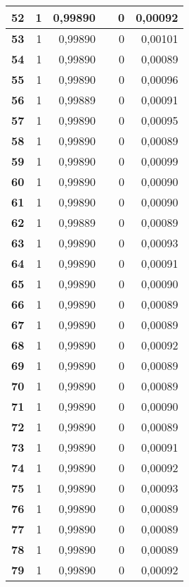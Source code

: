 {\begin{longtable}{|r|r|r|l|r|r|}
\textbf{52} & 1 & 0,99890 &  & 0 & 0,00092 \\ \hline
\textbf{53} & 1 & 0,99890 &  & 0 & 0,00101 \\ \hline
\textbf{54} & 1 & 0,99890 &  & 0 & 0,00089 \\ \hline
\textbf{55} & 1 & 0,99890 &  & 0 & 0,00096 \\ \hline
\textbf{56} & 1 & 0,99889 &  & 0 & 0,00091 \\ \hline
\textbf{57} & 1 & 0,99890 &  & 0 & 0,00095 \\ \hline
\textbf{58} & 1 & 0,99890 &  & 0 & 0,00089 \\ \hline
\textbf{59} & 1 & 0,99890 &  & 0 & 0,00099 \\ \hline
\textbf{60} & 1 & 0,99890 &  & 0 & 0,00090 \\ \hline
\textbf{61} & 1 & 0,99890 &  & 0 & 0,00090 \\ \hline
\textbf{62} & 1 & 0,99889 &  & 0 & 0,00089 \\ \hline
\textbf{63} & 1 & 0,99890 &  & 0 & 0,00093 \\ \hline
\textbf{64} & 1 & 0,99890 &  & 0 & 0,00091 \\ \hline
\textbf{65} & 1 & 0,99890 &  & 0 & 0,00090 \\ \hline
\textbf{66} & 1 & 0,99890 &  & 0 & 0,00089 \\ \hline
\textbf{67} & 1 & 0,99890 &  & 0 & 0,00089 \\ \hline
\textbf{68} & 1 & 0,99890 &  & 0 & 0,00092 \\ \hline
\textbf{69} & 1 & 0,99890 &  & 0 & 0,00089 \\ \hline
\textbf{70} & 1 & 0,99890 &  & 0 & 0,00089 \\ \hline
\textbf{71} & 1 & 0,99890 &  & 0 & 0,00090 \\ \hline
\textbf{72} & 1 & 0,99890 &  & 0 & 0,00089 \\ \hline
\textbf{73} & 1 & 0,99890 &  & 0 & 0,00091 \\ \hline
\textbf{74} & 1 & 0,99890 &  & 0 & 0,00092 \\ \hline
\textbf{75} & 1 & 0,99890 &  & 0 & 0,00093 \\ \hline
\textbf{76} & 1 & 0,99890 &  & 0 & 0,00089 \\ \hline
\textbf{77} & 1 & 0,99890 &  & 0 & 0,00089 \\ \hline
\textbf{78} & 1 & 0,99890 &  & 0 & 0,00089 \\ \hline
\textbf{79} & 1 & 0,99890 &  & 0 & 0,00092 \\ \hline

\end{longtable}}
